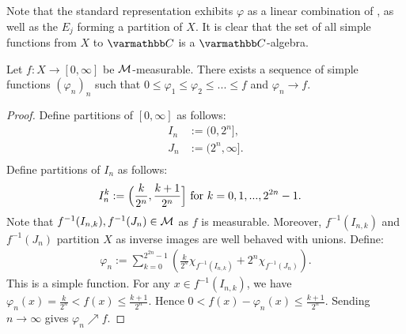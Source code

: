 Note that the standard representation exhibits $\varphi$ as a linear combination of , as well as the $E_j$ forming a partition of $X$. It is clear that the set of all simple functions from $X$ to $\bfC$ is a $\bfC$-algebra.

\begin{theorem}\label{thm:increasing-sequence-of-simple-functions}
    Let $f:X \rightarrow [0,\infty]$ be $\mathcal{M}$-measurable. There exists a sequence of simple functions $(\varphi_n)_n$ such that $0 \leq \varphi_1 \leq \varphi_2 \leq... \leq f$ and $\varphi_n \rightarrow f$. 

\end{theorem}
    \begin{proof}
        Define partitions of $[0,\infty]$ as follows: 
            \begin{equation*}
            \begin{split}
                I_n &:= (0,2^n],\\
                J_n &:= (2^n,\infty].\\
            \end{split}
            \end{equation*}
        Define partitions of $I_n$ as follows:
            \begin{equation*}
            \begin{split}
                I_n^k &:= \Bigl( \frac{k}{2^n},\frac{k+1}{2^n}\Bigr] \text{ for $k = 0,1,...,2^{2n}-1$}.
            \end{split}
            \end{equation*}
        Note that $f^{-1}(I_{n,k}), f^{-1}(J_n) \in \mathcal{M}$ as $f$ is measurable. Moreover, $f^{-1}(I_{n,k})$ and $f^{-1}(J_n)$ partition $X$ as inverse images are well behaved with unions. Define:
            \begin{equation*}
            \begin{split}
                \varphi_n := \sum_{k = 0}^{2^{2n}-1} \left( \frac{k}{2^n} \chi_{f^{-1}(I_{n,k})} + 2^n \chi_{f^{-1}(J_n)} \right).
            \end{split}
            \end{equation*}
        This is a simple function. For any $x \in f^{-1}(I_{n,k})$, we have $\varphi_n(x) = \frac{k}{2^n} < f(x) \leq \frac{k+1}{2^n}$. Hence $0 < f(x) - \varphi_n(x) \leq \frac{k+1}{2^n}$. Sending $n \rightarrow \infty$ gives $\varphi_n \nearrow f$.
    \end{proof}

